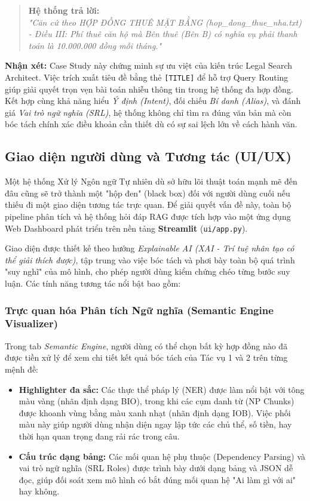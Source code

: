 \begin{quote}
\textbf{Hệ thống trả lời:}\\
\textit{"Căn cứ theo HỢP ĐỒNG THUÊ MẶT BẰNG (hop\_dong\_thue\_nha.txt) - Điều III: Phí thuê căn hộ mà Bên thuê (Bên B) có nghĩa vụ phải thanh toán là 10.000.000 đồng mỗi tháng."}
\end{quote}

\textbf{Nhận xét:} Case Study này chứng minh sự ưu việt của kiến trúc Legal Search Architect. Việc trích xuất tiêu đề bằng thẻ \texttt{[TITLE]} để hỗ trợ Query Routing giúp giải quyết trọn vẹn bài toán nhiễu thông tin trong hệ thống đa hợp đồng. Kết hợp cùng khả năng hiểu \textit{Ý định (Intent)}, đối chiếu \textit{Bí danh (Alias)}, và đánh giá \textit{Vai trò ngữ nghĩa (SRL)}, hệ thống không chỉ tìm ra đúng văn bản mà còn bóc tách chính xác điều khoản cần thiết dù có sự sai lệch lớn về cách hành văn.

\subsection{Giao diện người dùng và Tương tác (UI/UX)}

Một hệ thống Xử lý Ngôn ngữ Tự nhiên dù sở hữu lõi thuật toán mạnh mẽ đến đâu cũng sẽ trở thành một "hộp đen" (black box) đối với người dùng cuối nếu thiếu đi một giao diện tương tác trực quan. Để giải quyết vấn đề này, toàn bộ pipeline phân tích và hệ thống hỏi đáp RAG được tích hợp vào một ứng dụng Web Dashboard phát triển trên nền tảng \textbf{Streamlit} (\texttt{ui/app.py}). 

Giao diện được thiết kế theo hướng \textit{Explainable AI (XAI - Trí tuệ nhân tạo có thể giải thích được)}, tập trung vào việc bóc tách và phơi bày toàn bộ quá trình "suy nghĩ" của mô hình, cho phép người dùng kiểm chứng chéo từng bước suy luận. Các tính năng tương tác nổi bật bao gồm:

\subsubsection{Trực quan hóa Phân tích Ngữ nghĩa (Semantic Engine Visualizer)}
Trong tab \textit{Semantic Engine}, người dùng có thể chọn bất kỳ hợp đồng nào đã được tiền xử lý để xem chi tiết kết quả bóc tách của Tác vụ 1 và 2 trên từng mệnh đề:
\begin{itemize}
    \item \textbf{Highlighter đa sắc:} Các thực thể pháp lý (NER) được làm nổi bật với tông màu vàng (nhãn định dạng BIO), trong khi các cụm danh từ (NP Chunks) được khoanh vùng bằng màu xanh nhạt (nhãn định dạng IOB). Việc phối màu này giúp người dùng nhận diện ngay lập tức các chủ thể, số tiền, hay thời hạn quan trọng đang rải rác trong câu.
    \item \textbf{Cấu trúc dạng bảng:} Các mối quan hệ phụ thuộc (Dependency Parsing) và vai trò ngữ nghĩa (SRL Roles) được trình bày dưới dạng bảng và JSON dễ đọc, giúp đối soát xem mô hình có bắt đúng mối quan hệ "Ai làm gì với ai" hay không.
\end{itemize}

